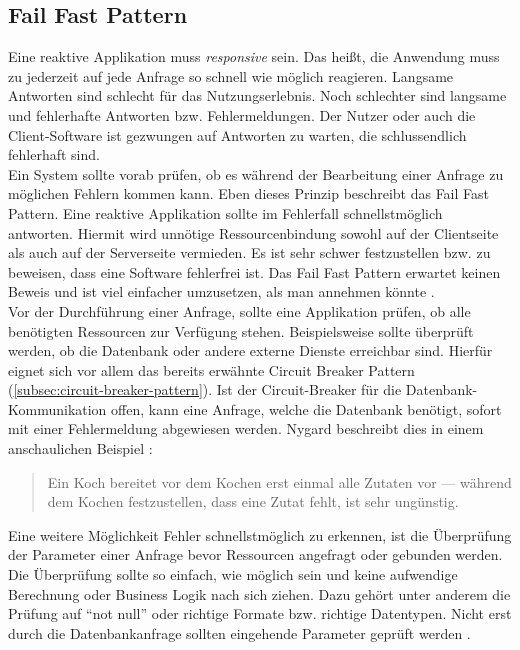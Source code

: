 \pagebreak

\subsection{Fail Fast Pattern}
Eine reaktive Applikation muss \textit{responsive} sein. Das heißt, die Anwendung muss zu jederzeit auf jede Anfrage so schnell wie möglich reagieren. Langsame Antworten sind schlecht für das Nutzungserlebnis. Noch schlechter sind langsame und fehlerhafte Antworten bzw. Fehlermeldungen. Der Nutzer oder auch die Client-Software ist gezwungen auf Antworten zu warten, die schlussendlich fehlerhaft sind.\\
Ein System sollte vorab prüfen, ob es während der Bearbeitung einer Anfrage zu möglichen Fehlern kommen kann. Eben dieses Prinzip beschreibt das Fail Fast Pattern. Eine reaktive Applikation sollte im Fehlerfall schnellstmöglich antworten. Hiermit wird unnötige Ressourcenbindung sowohl auf der Clientseite als auch auf der Serverseite vermieden. Es ist sehr schwer festzustellen bzw. zu beweisen, dass eine Software fehlerfrei ist. Das Fail Fast Pattern erwartet keinen Beweis und ist viel einfacher umzusetzen, als man annehmen könnte \cite[S.~106~\&~S.~107]{nygard_release_2007}.\\
Vor der Durchführung einer Anfrage, sollte eine Applikation prüfen, ob alle benötigten Ressourcen zur Verfügung stehen. Beispielsweise sollte überprüft werden, ob die Datenbank oder andere externe Dienste erreichbar sind. Hierfür eignet sich vor allem das bereits erwähnte Circuit Breaker Pattern (\ref{subsec:circuit-breaker-pattern}). Ist der Circuit-Breaker für die Datenbank-Kommunikation offen, kann eine Anfrage, welche die Datenbank benötigt, sofort mit einer Fehlermeldung abgewiesen werden. Nygard beschreibt dies in einem anschaulichen Beispiel \cite[S.~106]{nygard_release_2007}:

\begin{quotation}
Ein Koch bereitet vor dem Kochen erst einmal alle Zutaten vor --- während dem Kochen festzustellen, dass eine Zutat fehlt, ist sehr ungünstig.
\end{quotation}

Eine weitere Möglichkeit Fehler schnellstmöglich zu erkennen, ist die Überprüfung der Parameter einer Anfrage bevor Ressourcen angefragt oder gebunden werden. Die Überprüfung sollte so einfach, wie möglich sein und keine aufwendige Berechnung oder Business Logik nach sich ziehen. Dazu gehört unter anderem die Prüfung auf \enquote{not null} oder richtige Formate bzw. richtige Datentypen. Nicht erst durch die Datenbankanfrage sollten eingehende Parameter geprüft werden \cite[S.~107]{nygard_release_2007}.\\

